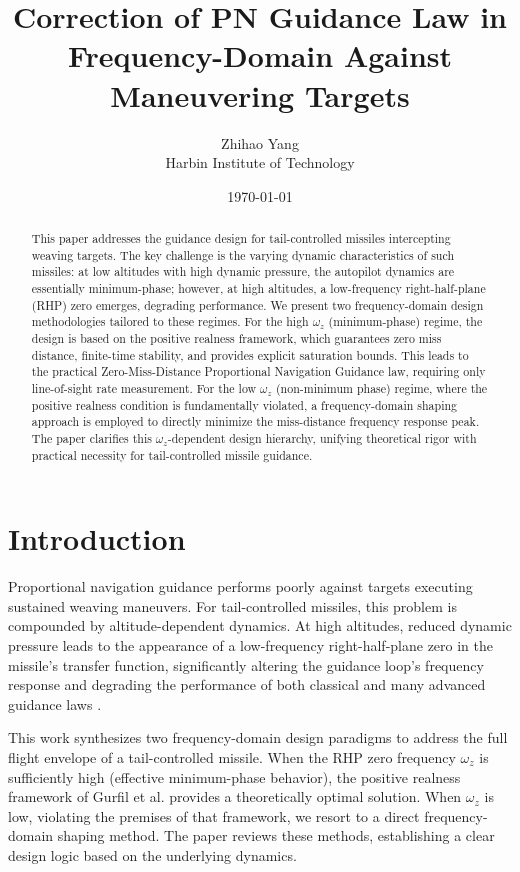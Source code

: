 \documentclass[11pt,a4paper]{article}
\title{Correction of PN Guidance Law in Frequency-Domain Against Maneuvering Targets}
\author{Zhihao Yang \\ Harbin Institute of Technology}
\date{\today}
\begin{document}
\maketitle

\begin{abstract}
This paper addresses the guidance design for tail-controlled missiles intercepting weaving targets. The key challenge is the varying dynamic characteristics of such missiles: at low altitudes with high dynamic pressure, the autopilot dynamics are essentially minimum-phase; however, at high altitudes, a low-frequency right-half-plane (RHP) zero emerges, degrading performance. We present two frequency-domain design methodologies tailored to these regimes. For the high $\omega_z$ (minimum-phase) regime, the design is based on the positive realness framework, which guarantees zero miss distance, finite-time stability, and provides explicit saturation bounds. This leads to the practical Zero-Miss-Distance Proportional Navigation Guidance law, requiring only line-of-sight rate measurement. For the low $\omega_z$ (non-minimum phase) regime, where the positive realness condition is fundamentally violated, a frequency-domain shaping approach is employed to directly minimize the miss-distance frequency response peak. The paper clarifies this $\omega_z$-dependent design hierarchy, unifying theoretical rigor with practical necessity for tail-controlled missile guidance.
\end{abstract}

\section{Introduction}
Proportional navigation guidance performs poorly against targets executing sustained weaving maneuvers. For tail-controlled missiles, this problem is compounded by altitude-dependent dynamics. At high altitudes, reduced dynamic pressure leads to the appearance of a low-frequency right-half-plane zero in the missile's transfer function, significantly altering the guidance loop's frequency response and degrading the performance of both classical and many advanced guidance laws \cite{Zarchan2002}.

This work synthesizes two frequency-domain design paradigms to address the full flight envelope of a tail-controlled missile. When the RHP zero frequency $\omega_z$ is sufficiently high (effective minimum-phase behavior), the positive realness framework of Gurfil et al. provides a theoretically optimal solution. When $\omega_z$ is low, violating the premises of that framework, we resort to a direct frequency-domain shaping method. The paper reviews these methods, establishing a clear design logic based on the underlying dynamics.
\end{document}

